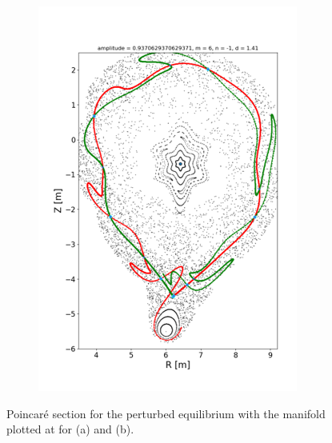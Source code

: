 \begin{figure}[H]
\begin{subfigure}{0.49\textwidth}
        \includegraphics[width=\textwidth]{images/toytok/toytok-61-0.9.png}
        \caption{}
        \label{fig:scan-wacky-b}
    \end{subfigure}
    \caption{Poincaré section for the perturbed equilibrium with the manifold plotted at for (a) and (b).}
    \label{fig:scan-wacky}
\end{figure}

